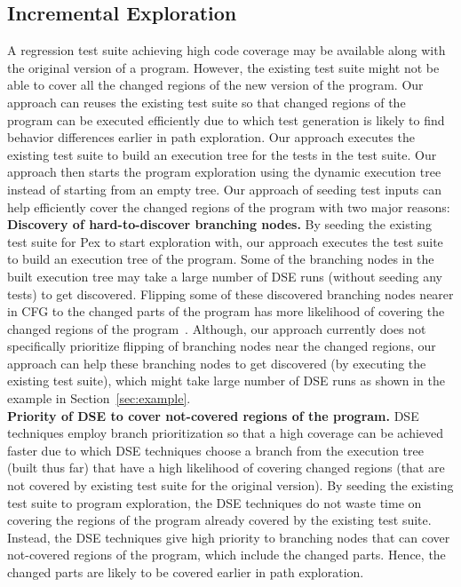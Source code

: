 \subsection{Incremental Exploration}
\vspace{-2ex}
\label{sec:incremental}
A regression test suite achieving high code coverage may be available along with the original version of  a program. 
However, the existing test suite might not be able to cover all the changed regions of the new version of the program. Our approach can reuses the existing test suite so that changed regions of the program can be executed efficiently due to which test generation is likely to find behavior differences earlier in path exploration. Our approach executes the existing test suite to build an execution
tree for the tests in the test suite. Our approach then starts the program
exploration using the dynamic execution tree instead of starting from an empty
tree. Our approach of seeding test inputs can help efficiently cover the changed regions of the program with two major reasons:
\\ \textbf{Discovery of hard-to-discover branching nodes.} By seeding the existing test suite for Pex to start exploration with, our approach executes the test suite to build an execution tree of the program. Some of the branching nodes in the built execution tree may take a large number of DSE runs (without seeding any tests) to get discovered. Flipping some of these discovered branching nodes nearer in CFG to the changed parts of the
program has more likelihood of covering the changed regions of the program~\cite{burnim}. Although, our approach currently does not specifically prioritize flipping of branching nodes near the changed regions, our approach can help these branching nodes to get discovered (by executing the existing test suite), which might take large number of DSE runs as shown in the example in Section~\ref{sec:example}.
\\ \textbf{Priority of DSE to cover not-covered regions of the program.} DSE techniques employ branch prioritization so that a high coverage can be achieved faster due to which DSE techniques choose a branch from the execution tree (built thus far) that have a high likelihood of covering changed regions (that are not covered by existing test suite for the original version). By seeding the existing test suite to program exploration, the DSE techniques do not waste time on covering the regions of the program already covered by the existing test suite. Instead, the DSE techniques give high priority to branching nodes that can cover not-covered regions of the program, which include the changed parts. Hence, the changed parts are likely to be covered earlier in path exploration.
 
